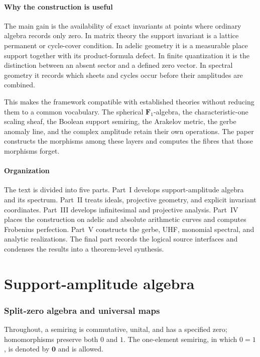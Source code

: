 \documentclass[11pt]{amsart}
\numberwithin{equation}{section}
\theoremstyle{definition}
\newcommand{\Fone}{\mathbf F_1}
\newcommand{\zero}{\mathbf 0}
\begin{document}
\subsection*{Why the construction is useful}

The main gain is the availability of exact invariants at points where
ordinary algebra records only zero.  In matrix theory the support invariant
is a lattice permanent or cycle-cover condition.  In adelic geometry it is
a measurable place support together with its product-formula defect.  In
finite quantization it is the distinction between an absent sector and a
defined zero vector.  In spectral geometry it records which sheets and
cycles occur before their amplitudes are combined.

This makes the framework compatible with established theories without
reducing them to a common vocabulary.  The spherical $\Fone$-algebra, the
characteristic-one scaling sheaf, the Boolean support semiring, the
Arakelov metric, the gerbe anomaly line, and the complex amplitude retain
their own operations.  The paper constructs the morphisms among these
layers and computes the fibres that those morphisms forget.

\subsection*{Organization}

The text is divided into five parts.  Part~I develops support-amplitude
algebra and its spectrum.  Part~II treats ideals, projective geometry, and
explicit invariant coordinates.  Part~III develops infinitesimal and
projective analysis.  Part~IV places the construction on adelic and
absolute arithmetic curves and computes Frobenius perfection.  Part~V
constructs the gerbe, UHF, monomial spectral, and analytic realizations.
The final part records the logical source interfaces and condenses the
results into a theorem-level synthesis.

\part{Support-amplitude algebra}

\section{Split-zero algebra and universal maps}

Throughout, a semiring is commutative, unital, and has a specified zero; homomorphisms preserve both $0$ and $1$.  The one-element semiring, in which $0=1$, is denoted by $\zero$ and is allowed.
\end{document}
